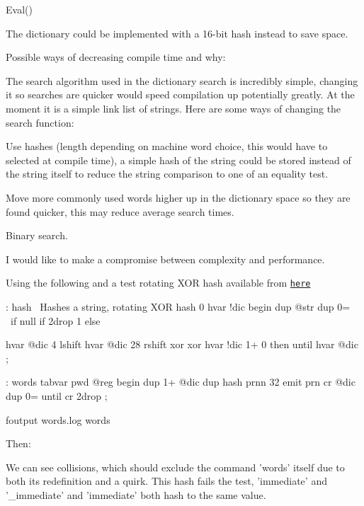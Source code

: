 \begin{DoxyItemize}
\item Eval()
\end{DoxyItemize}


\begin{DoxyItemize}
\item The dictionary could be implemented with a 16-\/bit hash instead to save space.
\end{DoxyItemize}


\begin{DoxyItemize}
\item Possible ways of decreasing compile time and why\-:
\end{DoxyItemize}

The search algorithm used in the dictionary search is incredibly simple, changing it so searches are quicker would speed compilation up potentially greatly. At the moment it is a simple link list of strings. Here are some ways of changing the search function\-:

Use hashes (length depending on machine word choice, this would have to selected at compile time), a simple hash of the string could be stored instead of the string itself to reduce the string comparison to one of an equality test.

Move more commonly used words higher up in the dictionary space so they are found quicker, this may reduce average search times.

Binary search.

I would like to make a compromise between complexity and performance.

Using the following and a test rotating X\-O\-R hash available from \href{http://eternallyconfuzzled.com/tuts/algorithms/jsw_tut_hashing.aspx}{\tt here}

\begin{DoxyVerb}  : hash \ Hashes a string, rotating XOR hash
      0 hvar !dic
      begin
          dup @str dup 0= \ if null
          if
              2drop 1       
          else

              hvar @dic 4 lshift hvar @dic 28 rshift xor
              xor hvar !dic 1+ 0
          then
      until
      hvar @dic
  ;

  : words
      tabvar pwd @reg 
      begin
          dup 1+ @dic dup hash prnn 32 emit prn cr
          @dic dup 0=   
      until
      cr
      2drop
  ;

  foutput words.log
  words\end{DoxyVerb}


Then\-:



We can see collisions, which should exclude the command 'words' itself due to both its redefinition and a quirk. This hash fails the test, 'immediate' and '\-\_\-immediate' and 'immediate' both hash to the same value. 